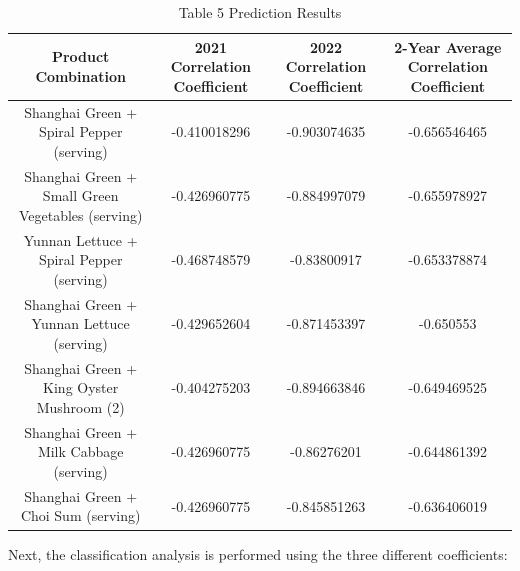 \documentclass{article}
\begin{document}
	\renewcommand{\arraystretch}{1.5}
	\begin{table}[h!]
		\centering
		\caption{Table 5 Prediction Results}
		\begin{tabular}{cccc}
			\toprule[1.5pt]
			\textbf{Product Combination} & \textbf{2021 Correlation Coefficient} & \textbf{2022 Correlation Coefficient} & \textbf{2-Year Average Correlation Coefficient} \\
			\midrule
			Shanghai Green + Spiral Pepper (serving) & -0.410018296 & -0.903074635 & -0.656546465 \\
			Shanghai Green + Small Green Vegetables (serving) & -0.426960775 & -0.884997079 & -0.655978927 \\
			Yunnan Lettuce + Spiral Pepper (serving) & -0.468748579 & -0.83800917 & -0.653378874 \\
			Shanghai Green + Yunnan Lettuce (serving) & -0.429652604 & -0.871453397 & -0.650553 \\
			Shanghai Green + King Oyster Mushroom (2) & -0.404275203 & -0.894663846 & -0.649469525 \\
			Shanghai Green + Milk Cabbage (serving) & -0.426960775 & -0.86276201 & -0.644861392 \\
			Shanghai Green + Choi Sum (serving) & -0.426960775 & -0.845851263 & -0.636406019 \\
			\bottomrule[1.5pt]
		\end{tabular}
	\end{table}
	
	Next, the classification analysis is performed using the three different coefficients:
	
\end{document}
